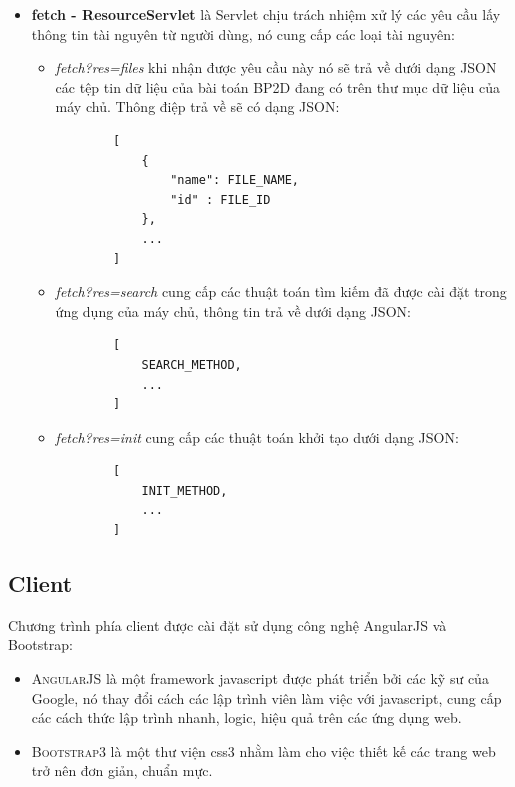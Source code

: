 \begin{itemize}
	\item \textbf{fetch - ResourceServlet} là Servlet chịu trách nhiệm xử lý các yêu cầu lấy thông tin tài nguyên từ người dùng, nó cung cấp các loại tài nguyên:
	\begin{itemize}
		\item \textit{fetch?res=files} khi nhận được yêu cầu này nó sẽ trả về dưới dạng JSON các tệp tin dữ liệu của bài toán BP2D đang có trên thư mục dữ liệu của máy chủ. Thông điệp trả về sẽ có dạng JSON:
		\begin{lstlisting}
		[
			{		
				"name": FILE_NAME,
				"id" : FILE_ID
			},
			...
		]
		\end{lstlisting}
		\item \textit{fetch?res=search} cung cấp các thuật toán tìm kiếm đã được cài đặt trong ứng dụng của máy chủ, thông tin trả về dưới dạng JSON:
		\begin{lstlisting}
		[
			SEARCH_METHOD,
			...
		]
		\end{lstlisting}
		\item \textit{fetch?res=init} cung cấp các thuật toán khởi tạo dưới dạng JSON:
		\begin{lstlisting}
		[
			INIT_METHOD,
			...
		]
		\end{lstlisting}
	\end{itemize}
\end{itemize}

\subsection{Client}
Chương trình phía client được cài đặt sử dụng công nghệ AngularJS và Bootstrap:
\begin{itemize}
	\item \textsc{AngularJS} là một framework javascript được phát triển bởi các kỹ sư của Google, nó thay đổi cách các lập trình viên làm việc với javascript, cung cấp các cách thức lập trình nhanh, logic, hiệu quả trên các ứng dụng web.
	\item \textsc{Bootstrap3} là một thư viện css3 nhằm làm cho việc thiết kế các trang web trở nên đơn giản, chuẩn mực.
\end{itemize}

